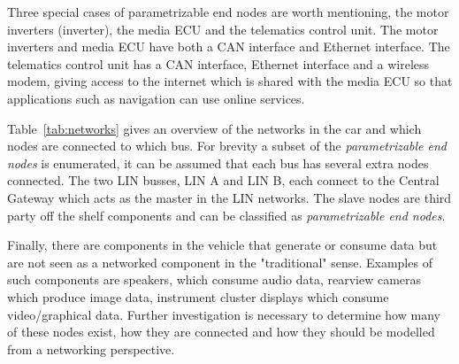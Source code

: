 Three special cases of parametrizable end nodes are worth mentioning, the motor inverters (inverter), the media ECU and the telematics control unit. The motor inverters and media ECU have both a CAN interface and Ethernet interface. The telematics control unit has a CAN interface, Ethernet interface and a wireless modem, giving access to the internet which is shared with the media ECU so that applications such as navigation can use online services.

Table~\ref{tab:networks} gives an overview of the networks in the car and which nodes are connected to which bus. For brevity a subset of the \textit{parametrizable end nodes} is enumerated, it can be assumed that each bus has several extra nodes connected. The two LIN busses, LIN A and LIN B, each connect to the Central Gateway which acts as the master in the LIN networks. The slave nodes are third party off the shelf components and can be classified as \textit{parametrizable end nodes}.

Finally, there are components in the vehicle that generate or consume data but are not seen as a networked component in the "traditional" sense. Examples of such components are speakers, which consume audio data, rearview cameras which produce image data, instrument cluster displays which consume video/graphical data. Further investigation is necessary to determine how many of these nodes exist, how they are connected and how they should be modelled from a networking perspective.

